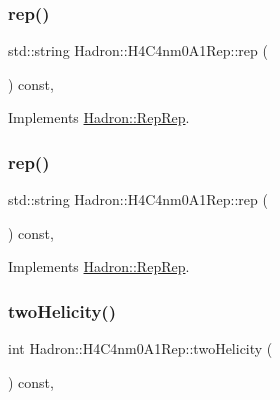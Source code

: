 \subsubsection{\texorpdfstring{rep()}{rep()}\hspace{0.1cm}{\footnotesize\ttfamily [4/5]}}
{\footnotesize\ttfamily std\+::string Hadron\+::\+H4\+C4nm0\+A1\+Rep\+::rep (\begin{DoxyParamCaption}{ }\end{DoxyParamCaption}) const\hspace{0.3cm}{\ttfamily [inline]}, {\ttfamily [virtual]}}



Implements \mbox{\hyperlink{structHadron_1_1RepRep_ab3213025f6de249f7095892109575fde}{Hadron\+::\+Rep\+Rep}}.

\mbox{\label{structHadron_1_1H4C4nm0A1Rep_a3f4b3af1601f3bc5c2a954c3e8c13c18}} 
\subsubsection{\texorpdfstring{rep()}{rep()}\hspace{0.1cm}{\footnotesize\ttfamily [5/5]}}
{\footnotesize\ttfamily std\+::string Hadron\+::\+H4\+C4nm0\+A1\+Rep\+::rep (\begin{DoxyParamCaption}{ }\end{DoxyParamCaption}) const\hspace{0.3cm}{\ttfamily [inline]}, {\ttfamily [virtual]}}



Implements \mbox{\hyperlink{structHadron_1_1RepRep_ab3213025f6de249f7095892109575fde}{Hadron\+::\+Rep\+Rep}}.

\mbox{\label{structHadron_1_1H4C4nm0A1Rep_a3d1124ede0ce759e05e5f9a89fd4ef55}} 
\subsubsection{\texorpdfstring{twoHelicity()}{twoHelicity()}\hspace{0.1cm}{\footnotesize\ttfamily [1/3]}}
{\footnotesize\ttfamily int Hadron\+::\+H4\+C4nm0\+A1\+Rep\+::two\+Helicity (\begin{DoxyParamCaption}{ }\end{DoxyParamCaption}) const\hspace{0.3cm}{\ttfamily [inline]}, {\ttfamily [virtual]}}

